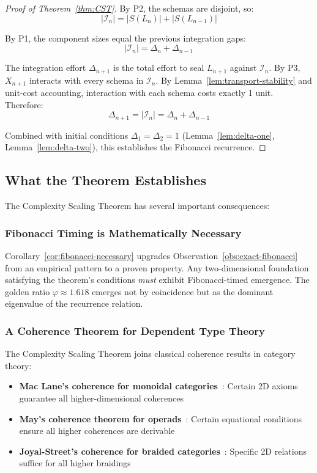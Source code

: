 \documentclass[11pt]{article}
\theoremstyle{definition}
\theoremstyle{remark}
\begin{document}
\begin{proof}[Proof of Theorem~\ref{thm:CST}]
By P2, the schemas are disjoint, so:
\[
|\mathcal{I}_n| = |S(L_n)| + |S(L_{n-1})|
\]

By P1, the component sizes equal the previous integration gaps:
\[
|\mathcal{I}_n| = \Delta_n + \Delta_{n-1}
\]

The integration effort $\Delta_{n+1}$ is the total effort to seal $L_{n+1}$ against $\mathcal{I}_n$. By P3, $X_{n+1}$
interacts with every schema in $\mathcal{I}_n$. By Lemma~\ref{lem:transport-stability} and unit-cost
accounting, interaction with each schema costs exactly 1 unit. Therefore:
\[
\Delta_{n+1} = |\mathcal{I}_n| = \Delta_n + \Delta_{n-1}
\]

Combined with initial conditions $\Delta_1 = \Delta_2 = 1$ (Lemma~\ref{lem:delta-one}, Lemma~\ref{lem:delta-two}), this
establishes the Fibonacci recurrence.
\end{proof}

\subsection{What the Theorem Establishes}

The Complexity Scaling Theorem has several important consequences:

\subsubsection{Fibonacci Timing is Mathematically Necessary}

Corollary~\ref{cor:fibonacci-necessary} upgrades Observation~\ref{obs:exact-fibonacci} from an
empirical pattern to a proven property. Any two-dimensional foundation satisfying the theorem's
conditions \emph{must} exhibit Fibonacci-timed emergence. The golden ratio $\varphi \approx 1.618$
emerges not by coincidence but as the dominant eigenvalue of the recurrence relation.

\subsubsection{A Coherence Theorem for Dependent Type Theory}

The Complexity Scaling Theorem joins classical coherence results in category theory:
\begin{itemize}
\item \textbf{Mac Lane's coherence for monoidal categories}~\cite{maclane1963natural}: Certain 2D axioms
guarantee all higher-dimensional coherences
\item \textbf{May's coherence theorem for operads}~\cite{may1972geometry}: Certain equational conditions
ensure all higher coherences are derivable
\item \textbf{Joyal-Street's coherence for braided categories}~\cite{joyal1993braided}: Specific 2D
relations suffice for all higher braidings
\end{itemize}
\end{document}
